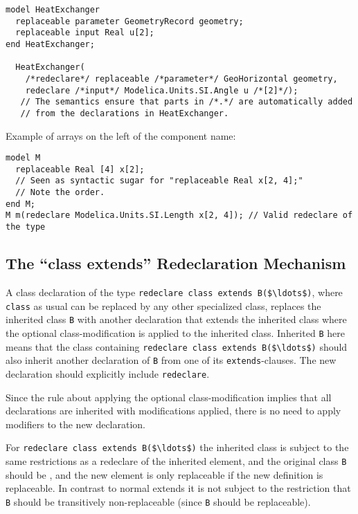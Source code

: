 \begin{nonnormative}
\begin{lstlisting}[language=modelica]
model HeatExchanger
  replaceable parameter GeometryRecord geometry;
  replaceable input Real u[2];
end HeatExchanger;

  HeatExchanger(
    /*redeclare*/ replaceable /*parameter*/ GeoHorizontal geometry,
    redeclare /*input*/ Modelica.Units.SI.Angle u /*[2]*/);
   // The semantics ensure that parts in /*.*/ are automatically added
   // from the declarations in HeatExchanger.
\end{lstlisting}

Example of arrays on the left of the component name:
\begin{lstlisting}[language=modelica]
model M
  replaceable Real [4] x[2];
  // Seen as syntactic sugar for "replaceable Real x[2, 4];"
  // Note the order.
end M;
M m(redeclare Modelica.Units.SI.Length x[2, 4]); // Valid redeclare of the type
\end{lstlisting}
\end{nonnormative}

\subsection{The ``class extends'' Redeclaration Mechanism}\label{the-class-extends-redeclaration-mechanism}

A class declaration of the type \lstinline!redeclare class extends B($\ldots$)!, where \lstinline!class! as usual can be replaced by any other specialized class, replaces the inherited class \lstinline!B! with another declaration that extends the inherited class where the optional class-modification is applied to the inherited class.
Inherited \lstinline!B! here means that the class containing \lstinline!redeclare class extends B($\ldots$)! should also inherit another declaration of \lstinline!B! from one of its \lstinline!extends!-clauses.
The new declaration should explicitly include \lstinline!redeclare!.

\begin{nonnormative}
Since the rule about applying the optional class-modification implies that all declarations are inherited with modifications applied, there is no need
to apply modifiers to the new declaration.
\end{nonnormative}

For \lstinline!redeclare class extends B($\ldots$)! the inherited class is subject to the same restrictions as a redeclare of the inherited element, and the original class \lstinline!B! should be , and the new element is only replaceable if the new definition is replaceable.
In contrast to normal extends it is not subject to the restriction that \lstinline!B! should be transitively non-replaceable (since \lstinline!B! should be replaceable).

